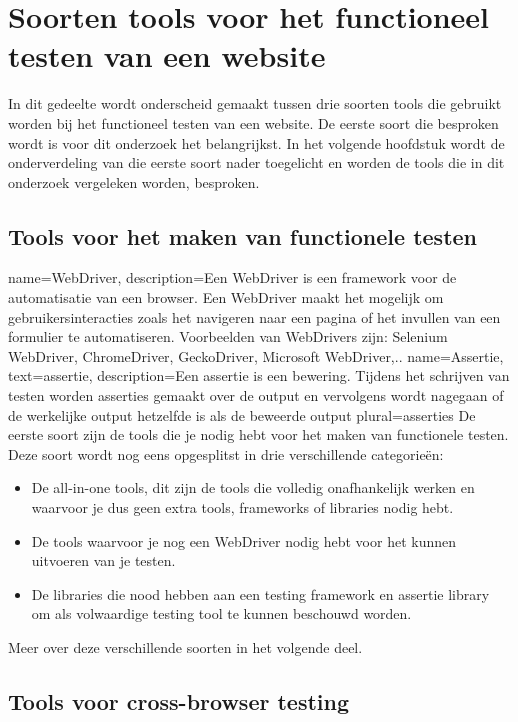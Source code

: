 \section{Soorten tools voor het functioneel testen van een website}

In dit gedeelte wordt onderscheid gemaakt tussen drie soorten tools die gebruikt worden bij het functioneel testen van een website. De eerste soort die besproken wordt is voor dit onderzoek het belangrijkst. In het volgende hoofdstuk wordt de onderverdeling van die eerste soort nader toegelicht en worden de tools die in dit onderzoek vergeleken worden, besproken.

\subsection{Tools voor het maken van functionele testen}
{
    name=WebDriver,
    description={Een WebDriver is een framework voor de automatisatie van een browser. Een WebDriver maakt het mogelijk om gebruikersinteracties zoals het navigeren naar een pagina of het invullen van een formulier te automatiseren. Voorbeelden van WebDrivers zijn: Selenium WebDriver, ChromeDriver, GeckoDriver, Microsoft WebDriver,..}
}
{
    name=Assertie,
    text=assertie,
    description={Een assertie is een bewering. Tijdens het schrijven van testen worden asserties gemaakt over de output en vervolgens wordt nagegaan of de werkelijke output hetzelfde is als de beweerde output}
    plural={asserties}
}
De eerste soort zijn de tools die je nodig hebt voor het maken van functionele testen. Deze soort wordt nog eens opgesplitst in drie verschillende categorieën: 
\begin{itemize}
\item De all-in-one tools, dit zijn de tools die volledig onafhankelijk werken en waarvoor je dus geen extra tools, frameworks of libraries nodig hebt.
\item De tools waarvoor je nog een \gls{WebDriver} nodig hebt voor het kunnen uitvoeren van je testen.
\item De libraries die nood hebben aan een testing framework en \gls{assertie} \gls{library} om als volwaardige testing tool te kunnen beschouwd worden.
\end{itemize}
Meer over deze verschillende soorten in het volgende deel.
\subsection{Tools voor cross-browser testing}

